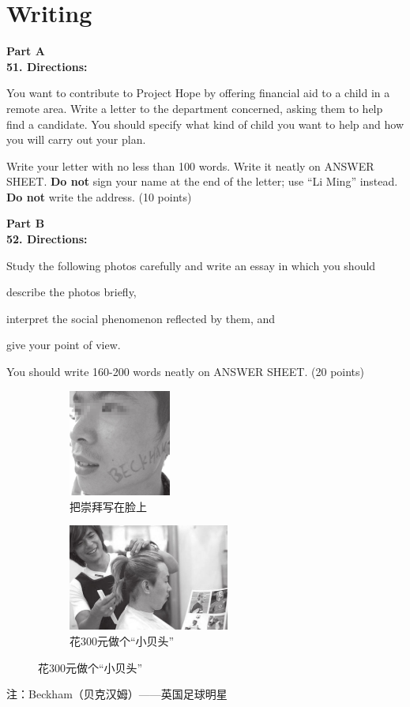 \newpage
\section{Writing}


\noindent
\textbf{Part A}\\
\textbf{51. Directions:}

You want to contribute to Project Hope by offering financial aid to a
child in a remote area. Write a letter to the department concerned,
asking them to help find a candidate. You should specify what kind of
child you want to help and how you will carry out your plan.

Write your letter with no less than 100 words. Write it neatly on ANSWER
SHEET.
\textbf{Do not} sign your name at the end of the letter; use ``Li Ming''
instead.
\textbf{Do not} write the address. (10 points)


\vspace{2em}

\noindent
\textbf{Part B}\\
\textbf{52. Directions:}

Study the following photos carefully and write an essay in which you
should
\begin{listwrite}
	\item 
 describe the photos briefly,
\item
interpret the social phenomenon reflected by them, and
\item
give your point of view.
\end{listwrite}

You should write 160-200 words neatly on ANSWER SHEET. (20 points)




\begin{figure}[ht]
	\begin{subfigure}[b]{0.45\linewidth}
		\centering
		\includegraphics[height=3.5cm]{picture/2006_1.png}
		\caption*{把崇拜写在脸上}
	\end{subfigure}
\hfil
	\begin{subfigure}[b]{0.45\linewidth}
		\centering
		\includegraphics[height=3.5cm]{picture/2006_2.png} 
		\caption*{花300元做个“⼩贝头”}
		\label{fig:2}
	\end{subfigure}
\end{figure}


注：Beckham（贝克汉姆）——英国⾜球明星




